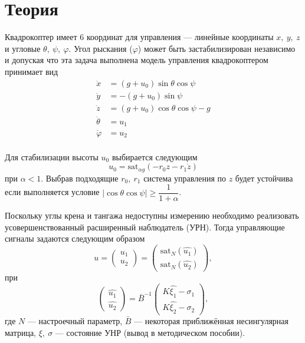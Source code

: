 \documentclass[14pt]{extarticle}
\begin{document}
    

    \section*{Теория}
    Квадрокоптер имеет 6 координат для управления --- линейные координаты $x,\ y,\ z$ и угловые $\theta,\ \psi,\ \varphi$.
    Угол рыскания ($\varphi$) может быть застабилизирован независимо и допуская что эта задача выполнена модель управления
    квадрокоптером принимает вид
    \begin{equation}\label{eq:model}
        \begin{aligned}
            \ddot{x} & = (g + u_0)\sin\theta\cos\psi\\
            \ddot{y} & = -(g + u_0)\sin\psi\\
            \ddot{z} & = (g + u_0)\cos\theta\cos\psi - g\\
            \ddot{\theta} & = u_1\\
            \ddot{\varphi} & = u_2\\
        \end{aligned}
    \end{equation}

    Для стабилизации высоты $u_0$ выбирается следующим
    \begin{equation}\label{eq:u0}
        u_0 = \text{sat}_{\alpha g}\left( -r_0z - r_1\dot{z} \right)
    \end{equation}
    при $\alpha < 1$. Выбрав подходящие $r_0,\ r_1$ система управления по $z$ будет устойчива если выполняется условие
    $\left| \cos\theta\cos\psi \right| \ge \dfrac{1}{1+\alpha}$.

    Поскольку углы крена и тангажа недоступны измерению необходимо реализовать усовершенствованный расширенный наблюдатель (УРН).
    Тогда управляющие сигналы задаются следующим образом
    \begin{equation}\label{eq:u}
        u =
        \begin{pmatrix}
            u_1 \\
            u_2
        \end{pmatrix} =
        \begin{pmatrix}
            \text{sat}_N(\hat{u_1})\\
            \text{sat}_N(\hat{u_2})
        \end{pmatrix},
    \end{equation}
    при
    \begin{equation}\label{eq:est u}
        \begin{pmatrix}
            \hat{u_1} \\
            \hat{u_2}
        \end{pmatrix} =
        \bar{B}^{-1}
        \begin{pmatrix}
            K\hat{\xi_1} - \sigma_1 \\
            K\hat{\xi_2} - \sigma_2
        \end{pmatrix},
    \end{equation}
    где $N$ --- настроечный параметр,
    $\bar{B}$ --- некоторая приближённая несингулярная матрица,
    $\xi,\ \sigma$ --- состояние УНР (вывод в методическом пособии).
\end{document}
